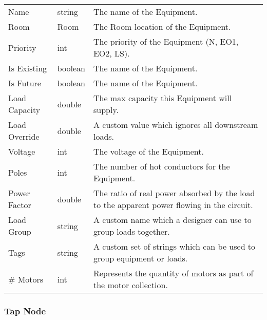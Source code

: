 \documentclass[letterpaper,10pt,english]{sphinxmanual}
\begin{document}
\begin{savenotes}\sphinxattablestart
\centering
\begin{tabulary}{\linewidth}[t]{|T|T|T|}
\hline
\sphinxstyletheadfamily 
{}
&\sphinxstyletheadfamily 
{}
&\sphinxstyletheadfamily 
{}
\\
\hline
Name
&
string
&
The name of the Equipment.
\\
\hline
Room
&
Room
&
The Room location of the Equipment.
\\
\hline
Priority
&
int
&
The priority of the Equipment (N, EO1, EO2, LS).
\\
\hline
Is Existing
&
boolean
&
The name of the Equipment.
\\
\hline
Is Future
&
boolean
&
The name of the Equipment.
\\
\hline
Load Capacity
&
double
&
The max capacity this Equipment will supply.
\\
\hline
Load Override
&
double
&
A custom value which ignores all downstream loads.
\\
\hline
Voltage
&
int
&
The voltage of the Equipment.
\\
\hline
Poles
&
int
&
The number of hot conductors for the Equipment.
\\
\hline
Power Factor
&
double
&
The ratio of real power absorbed by the load to the apparent power flowing in the circuit.
\\
\hline
Load Group
&
string
&
A custom name which a designer can use to group loads together.
\\
\hline
Tags
&
string
&
A custom set of strings which can be used to group equipment or loads.
\\
\hline
\# Motors
&
int
&
Represents the quantity of motors as part of the motor collection.
\\
\hline
\end{tabulary}
\par
\sphinxattableend\end{savenotes}


\subsubsection{Tap Node}
\label{\detokenize{docs/definitions/index-definitions:tap-node}}\label{\detokenize{docs/definitions/index-definitions:tap-node-definition}}
\end{document}
